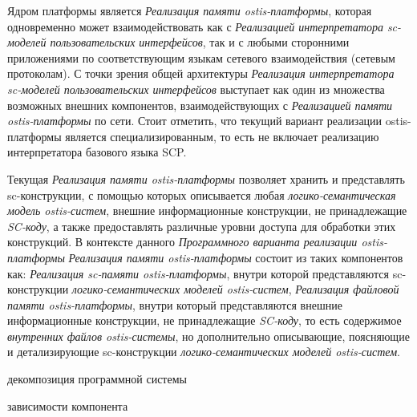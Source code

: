 Ядром платформы является \textit{Реализация памяти ostis-платформы}, которая одновременно может взаимодействовать как с \textit{Реализацией интерпретатора sc-моделей пользовательских интерфейсов}, так и с любыми сторонними приложениями по соответствующим языкам сетевого взаимодействия (сетевым протоколам). С точки зрения общей архитектуры \textit{Реализация интерпретатора sc-моделей пользовательских интерфейсов} выступает как один из множества возможных внешних компонентов, взаимодействующих с \textit{Реализацией памяти ostis-платформы} по сети. Стоит отметить, что текущий вариант реализации ostis-платформы является специализированным, то есть не включает реализацию интерпретатора базового языка SCP.

Текущая \textit{Реализация памяти ostis-платформы} позволяет хранить и представлять sc-конструкции, с помощью которых описывается любая \textit{логико-семантическая модель ostis-систем}, внешние информационные конструкции, не принадлежащие \textit{SC-коду}, а также предоставлять различные уровни доступа для обработки этих конструкций. В контексте данного \textit{Программного варианта реализации ostis-платформы} \textit{Реализация памяти ostis-платформы} состоит из таких компонентов как: \textit{Реализация sc-памяти ostis-платформы}, внутри которой представляются sc-конструкции \textit{логико-семантических моделей ostis-систем}, \textit{Реализация файловой памяти ostis-платформы}, внутри который представляются внешние информационные конструкции, не принадлежащие \textit{SC-коду}, то есть содержимое \textit{внутренних файлов ostis-системы}, но дополнительно описывающие, поясняющие и детализирующие sc-конструкции \textit{логико-семантических моделей ostis-систем}.

\begin{SCn}
\begin{scnrelfromset}{декомпозиция программной системы}
\end{scnrelfromset}
\begin{scnrelfromset}{зависимости компонента}
\end{scnrelfromset}
\end{SCn}


